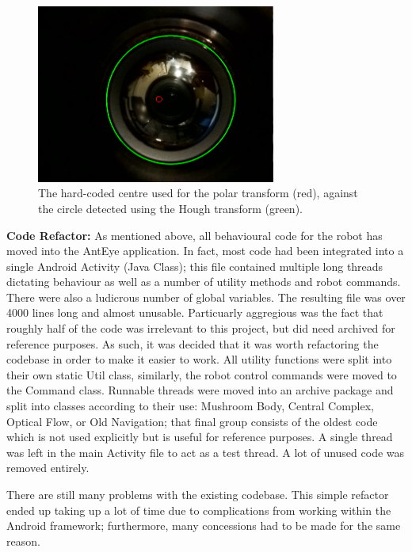 \documentclass[a4paper,11pt,twoside,openright]{article}
\begin{document}
\begin{figure}
  \centering
  \includegraphics[width=0.7\textwidth]{Centre}
  \caption{\label{fig:centre} The hard-coded centre used for the polar transform
    (red), against the circle detected using the Hough transform (green).
   }
\end{figure}

\textbf{Code Refactor:}
As mentioned above, all behavioural code for the robot has moved into the AntEye
application. In fact, most code had been integrated into a single Android
Activity (Java Class); this file contained multiple long threads dictating
behaviour as well as a number of utility methods and robot commands. There
were also a ludicrous number of global variables. The resulting file was over
4000 lines long and almost unusable. Particuarly aggregious was the fact that
roughly half of the code was irrelevant to this project, but did need archived
for reference purposes. As such, it was decided that it was worth refactoring the
codebase in order to make it easier to work. All utility functions were split
into their own static Util class, similarly, the robot control commands were
moved to the Command class. Runnable threads were moved into an archive
package and split into classes according to their use: Mushroom Body,
Central Complex, Optical Flow, or Old Navigation; that final group consists of
the oldest code which is not used explicitly but is useful for reference
purposes. A single thread was left in the main Activity file to act as a test
thread. A lot of unused code was removed entirely.
\newline
\par

There are still many problems with the existing codebase. This simple refactor
ended up taking up a lot of time due to complications from working within the
Android framework; furthermore, many concessions had to be made for the same
reason.
\newline
\par
\end{document}
